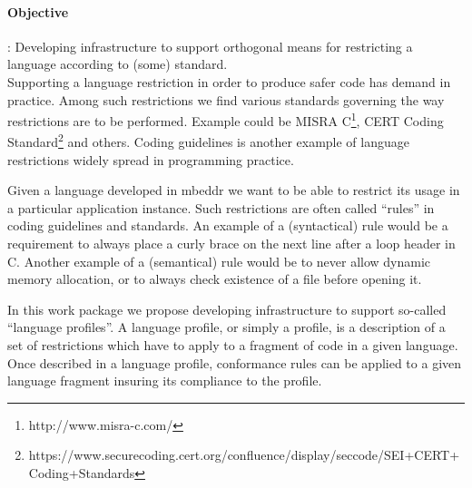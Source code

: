 \paragraph{\textbf{Objective}}: Developing infrastructure to support orthogonal
means for restricting a language according to (some) standard.\vspace{.2cm}\\
Supporting a language restriction in order to produce safer code has
demand in practice. Among such restrictions we find various standards
governing the way restrictions are to be performed. Example could be MISRA
C\footnote{http://www.misra-c.com/}, CERT Coding
Standard\footnote{https://www.securecoding.cert.org/confluence/display/seccode/SEI+CERT+Coding+Standards}
and others. Coding guidelines is another example of language restrictions 
widely spread in programming practice.

Given a language developed in mbeddr we want to be able to restrict its usage in
a particular application instance. Such restrictions are often called ``rules''
in coding guidelines and standards. An example of a (syntactical) rule would be
a requirement to always place a curly brace on the next line after a loop header
in C. Another example of a (semantical) rule would be to never allow dynamic
memory allocation, or to always check existence of a file before opening it.

In this work package we propose developing infrastructure to support
so-called ``language profiles''. A language profile, or simply a profile, is a
description of a set of restrictions which have to apply to a fragment of code
in a given language. Once described in a language profile, conformance rules
can be applied to a given language fragment insuring its compliance to the
profile.
  
